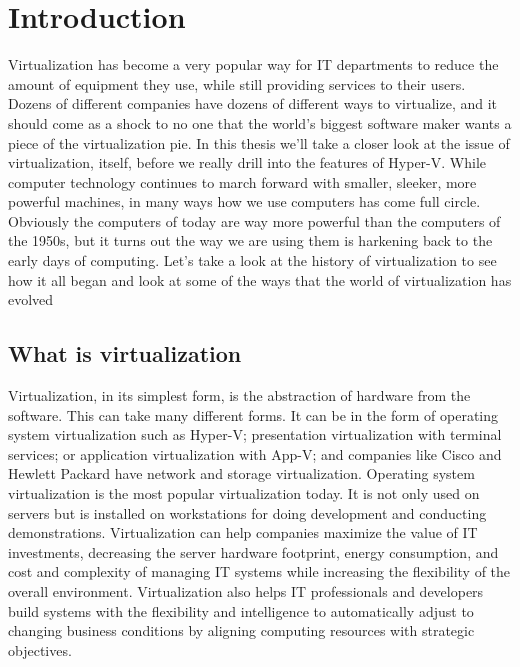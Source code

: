 \chapter{Introduction}

\vspace{5mm}
Virtualization has become a very popular way for IT departments to reduce the amount of equipment they use, while still providing services to their users. 
Dozens of different companies have dozens of different ways to virtualize, and it should come as a shock to no one that the world’s biggest software maker wants a 
piece of the virtualization pie. In this thesis we’ll take a closer look at the issue of virtualization, itself, before we really drill into the features of Hyper-V.
While computer technology continues to march forward with smaller, sleeker, more powerful machines, in many ways how we use computers has come full circle. Obviously 
the computers of today are way more powerful than the computers of the 1950s, but it turns out the way we are using them is harkening back to the early days of computing. 
Let’s take a look at the history of virtualization to see how it all began and look at some of the ways that the world of virtualization has evolved

\vspace{5mm}
\section{What is virtualization}

Virtualization, in its simplest form, is the abstraction of hardware from the software. This can take many different forms. It can be in the form of operating system 
virtualization such as Hyper-V; presentation virtualization with terminal services; or application virtualization with App-V; and companies like Cisco and Hewlett 
Packard have network and storage virtualization. Operating system virtualization is the most popular virtualization today. It is not only used on servers but is installed 
on workstations for doing development and conducting demonstrations. Virtualization can help companies maximize the value of IT investments, decreasing the server hardware 
footprint, energy consumption, and cost and complexity of managing IT systems while increasing the flexibility of the overall environment. Virtualization also helps IT 
professionals and developers build systems with the flexibility and intelligence to automatically adjust to changing business conditions by aligning computing resources 
with strategic objectives.

